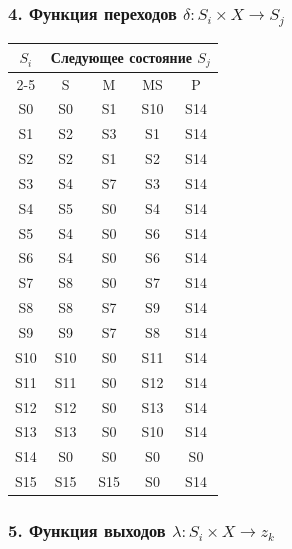 \documentclass[11pt,a4paper,final]{article}
\begin{document}
	\subsubsection*{4. Функция переходов \( \delta: S_i \times X \rightarrow S_j \)}
	\begin{center}
		\label{tab3:1}
		\small
		\begin{tabular}{|c|c|c|c|c|}
			\hline
			\multirow{2}{*}{\( S_i \)} & \multicolumn{4}{c|}{Следующее состояние \( S_j \)} \\
			\cline{2-5}
			& S & M & MS & P \\
			\hline
			S0 & S0 & S1 & S10 & S14 \\
			S1 & S2 & S3 & S1 & S14 \\
			S2 & S2 & S1 & S2 & S14 \\
			S3 & S4 & S7 & S3 & S14 \\
			S4 & S5 & S0 & S4 & S14 \\
			S5 & S4 & S0 & S6 & S14 \\
			S6 & S4 & S0 & S6 & S14 \\
			S7 & S8 & S0 & S7 & S14 \\
			S8 & S8 & S7 & S9 & S14 \\
			S9 & S9 & S7 & S8 & S14 \\
			S10 & S10 & S0 & S11 & S14 \\
			S11 & S11 & S0 & S12 & S14 \\
			S12 & S12 & S0 & S13 & S14 \\
			S13 & S13 & S0 & S10 & S14 \\
			S14 & S0 & S0 & S0 & S0 \\
			S15 & S15 & S15 & S0 & S14 \\
			\hline
		\end{tabular}
	\end{center}
	
	\subsubsection*{5. Функция выходов \( \lambda: S_i \times X \rightarrow z_k \)}
	
\end{document}
